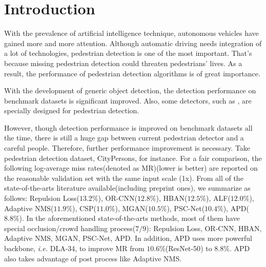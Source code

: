 \documentclass[twocolumn]{article}
\begin{document}
\section{Introduction}
With the prevalence of artificial intelligence technique, autonomous vehicles have gained more and more attention. Although automatic driving needs integration of a lot of technologies, pedestrian detection is one of the most important. That's because missing pedestrian detection could threaten pedestrians' lives. As a result, the performance of pedestrian detection algorithms is of great importance. \par 
With the development of generic object detection\cite{redmon2017yolo9000, redmon2016you, liu2016ssd, ren2015faster, girshick2014rich, girshick2015fast}, the detection performance on benchmark datasets\cite{dollar2009pedestrian, geiger2012we, zhang2017citypersons, shao2018crowdhuman, braun2019eurocity} is significant improved. Also, some detectors, such as \cite{liu2018learning, liu2019high, DBLP:journals/corr/abs-1910-09188,pang2019mask}, are specially designed for pedestrian detection. \par 
However, though detection performance is improved on benchmark datasets all the time, there is still a huge gap between current pedestrian detector and a careful people\cite{zhang2017towards}. Therefore, further performance improvement is necessary. Take pedestrian detection dataset, CityPersons\cite{zhang2017citypersons}, for instance. For a fair comparison, the following log-average miss rates(denoted as MR)(lower is better) are reported on the reasonable validation set with the same input scale (1x). From all of the state-of-the-arts literature available(including preprint ones), we summarize as follows: Repulsion Loss\cite{wang2018repulsion}($13.2\%$), OR-CNN\cite{zhang2018occlusion}($12.8\%$), HBAN\cite{lu2019semantic}($12.5\%$), ALF\cite{liu2018learning}($12.0\%$), Adaptive NMS\cite{liu2019adaptive}($11.9\%$), CSP\cite{liu2019high}($11.0\%$), MGAN\cite{pang2019mask}($10.5\%$), PSC-Net\cite{xie2020psc}($10.4\%$), APD\cite{DBLP:journals/corr/abs-1910-09188}($8.8\%$). In the aforementioned state-of-the-arts methods, most of them have special occlusion/crowd handling process($7/9$): Repulsion Loss\cite{wang2018repulsion}, OR-CNN\cite{zhang2018occlusion}, HBAN\cite{lu2019semantic}, Adaptive NMS\cite{liu2019adaptive}, MGAN\cite{pang2019mask}, PSC-Net\cite{xie2020psc}, APD\cite{DBLP:journals/corr/abs-1910-09188}. In addition, APD\cite{DBLP:journals/corr/abs-1910-09188} uses more powerful backbone, \textit{i.e.} DLA-34\cite{yu2018deep}, to improve MR from $10.6\%$(ResNet-50\cite{he2016deep}) to $8.8\%$. APD\cite{DBLP:journals/corr/abs-1910-09188} also takes advantage of post process like Adaptive NMS\cite{liu2019adaptive}.\par 
\end{document}
